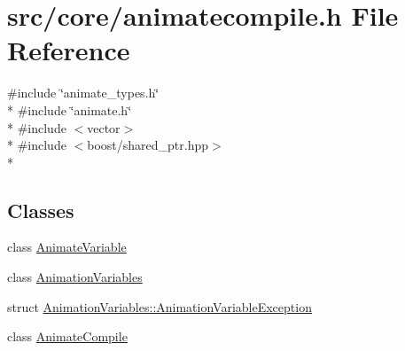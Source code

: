 \hypertarget{a00200}{\section{src/core/animatecompile.h File Reference}
\label{a00200}
}
{\ttfamily \#include \char`\"{}animate\-\_\-types.\-h\char`\"{}}\\*
{\ttfamily \#include \char`\"{}animate.\-h\char`\"{}}\\*
{\ttfamily \#include $<$vector$>$}\\*
{\ttfamily \#include $<$boost/shared\-\_\-ptr.\-hpp$>$}\\*
\subsection*{Classes}
\begin{DoxyCompactItemize}
\item 
class \hyperlink{a00009}{Animate\-Variable}
\item 
class \hyperlink{a00014}{Animation\-Variables}
\item 
struct \hyperlink{a00013}{Animation\-Variables\-::\-Animation\-Variable\-Exception}
\item 
class \hyperlink{a00007}{Animate\-Compile}
\end{DoxyCompactItemize}
